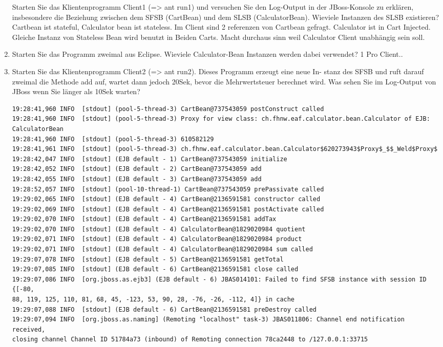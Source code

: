 \documentclass[a4paper,10pt]{scrreprt}
\begin{document}
\begin{enumerate}
\begin{lstlisting}[language={}]
\end{lstlisting}
Starten Sie das Klientenprogramm Client1 (=> ant run1) und versuchen Sie den Log-Output in der
JBoss-Konsole zu erklären, insbesondere die Beziehung zwischen dem SFSB (CartBean) und dem
SLSB (CalculatorBean). Wieviele Instanzen des SLSB existieren?
{\color{red} Cartbean ist stateful, Calculator bean ist stateless. Im Client sind 2 referenzen von Cartbean gefragt. 
Calculator ist in Cart Injected. Gleiche Instanz von Stateless Bean wird benutzt in Beiden Carts. Macht durchaus sinn 
weil Calculator Client unabhängig sein soll.}
\item Starten Sie das Programm zweimal aus Eclipse. Wieviele Calculator-Bean Instanzen werden dabei
verwendet? {\color{red} 1 Pro Client..}
\item Starten Sie das Klientenprogramm Client2 (=> ant run2). Dieses Programm erzeugt eine neue In-
stanz des SFSB und ruft darauf zweimal die Methode add auf, wartet dann jedoch 20Sek, bevor die
Mehrwertsteuer berechnet wird. Was sehen Sie im Log-Output von JBoss wenn Sie länger als 10Sek
warten?
\begin{lstlisting}[language={}]
 19:28:41,960 INFO  [stdout] (pool-5-thread-3) CartBean@737543059 postConstruct called
19:28:41,960 INFO  [stdout] (pool-5-thread-3) Proxy for view class: ch.fhnw.eaf.calculator.bean.Calculator of EJB: 
CalculatorBean
19:28:41,960 INFO  [stdout] (pool-5-thread-3) 610582129
19:28:41,961 INFO  [stdout] (pool-5-thread-3) ch.fhnw.eaf.calculator.bean.Calculator$620273943$Proxy$_$$_Weld$Proxy$
19:28:42,047 INFO  [stdout] (EJB default - 1) CartBean@737543059 initialize
19:28:42,052 INFO  [stdout] (EJB default - 2) CartBean@737543059 add
19:28:42,055 INFO  [stdout] (EJB default - 3) CartBean@737543059 add
19:28:52,057 INFO  [stdout] (pool-10-thread-1) CartBean@737543059 prePassivate called
19:29:02,065 INFO  [stdout] (EJB default - 4) CartBean@2136591581 constructor called
19:29:02,069 INFO  [stdout] (EJB default - 4) CartBean@2136591581 postActivate called
19:29:02,070 INFO  [stdout] (EJB default - 4) CartBean@2136591581 addTax
19:29:02,070 INFO  [stdout] (EJB default - 4) CalculatorBean@1829020984 quotient
19:29:02,071 INFO  [stdout] (EJB default - 4) CalculatorBean@1829020984 product
19:29:02,071 INFO  [stdout] (EJB default - 4) CalculatorBean@1829020984 sum called
19:29:07,078 INFO  [stdout] (EJB default - 5) CartBean@2136591581 getTotal
19:29:07,085 INFO  [stdout] (EJB default - 6) CartBean@2136591581 close called
19:29:07,086 INFO  [org.jboss.as.ejb3] (EJB default - 6) JBAS014101: Failed to find SFSB instance with session ID {[-80, 
88, 119, 125, 110, 81, 68, 45, -123, 53, 90, 28, -76, -26, -112, 4]} in cache
19:29:07,088 INFO  [stdout] (EJB default - 6) CartBean@2136591581 preDestroy called
19:29:07,094 INFO  [org.jboss.as.naming] (Remoting "localhost" task-3) JBAS011806: Channel end notification received, 
closing channel Channel ID 51784a73 (inbound) of Remoting connection 78ca2448 to /127.0.0.1:33715


\end{lstlisting}
\end{enumerate}
\end{document}
